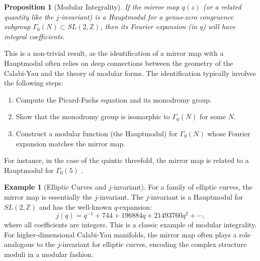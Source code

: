 \documentclass{book}
\newcommand{\qexp}{q} %
\newcommand{\zmod}{z} %
\newcommand{\jinv}{j} %
\newtheorem{proposition}[theorem]{Proposition}
\theoremstyle{definition}
\newtheorem{example}[theorem]{Example}
\begin{document}
\begin{proposition}[Modular Integrality]
\label{prop:modular_integrality}
If the mirror map $\qexp(\zmod)$ (or a related quantity like the $j$-invariant) is a Hauptmodul for a genus-zero congruence subgroup $\Gamma_0(N) \subset SL(2, \mathbb{Z})$, then its Fourier expansion (in $\qexp$) will have integral coefficients.
\end{proposition}
This is a non-trivial result, as the identification of a mirror map with a Hauptmodul often relies on deep connections between the geometry of the Calabi-Yau and the theory of modular forms. The identification typically involves the following steps:
\begin{enumerate}
    \item Compute the Picard-Fuchs equation and its monodromy group.
    \item Show that the monodromy group is isomorphic to $\Gamma_0(N)$ for some $N$.
    \item Construct a modular function (the Hauptmodul) for $\Gamma_0(N)$ whose Fourier expansion matches the mirror map.
\end{enumerate}
For instance, in the case of the quintic threefold, the mirror map is related to a Hauptmodul for $\Gamma_0(5)$ \cite{Candelas1991}.

\begin{example}[Elliptic Curves and $j$-invariant]
For a family of elliptic curves, the mirror map is essentially the $j$-invariant. The $j$-invariant is a Hauptmodul for $SL(2, \mathbb{Z})$ and has the well-known $\qexp$-expansion:
\[
\jinv(\qexp) = \qexp^{-1} + 744 + 196884 \qexp + 21493760 \qexp^2 + \cdots,
\]
where all coefficients are integers. This is a classic example of modular integrality. For higher-dimensional Calabi-Yau manifolds, the mirror map often plays a role analogous to the $j$-invariant for elliptic curves, encoding the complex structure moduli in a modular fashion.
\end{example}
\end{document}
